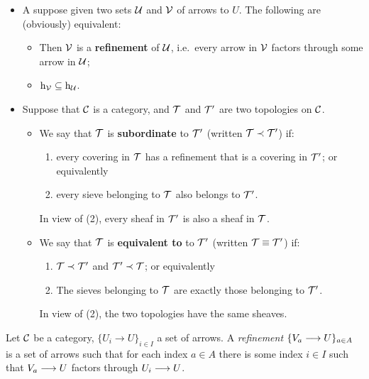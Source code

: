 \begin{2   CONTRAVARIANT FUNCTORS}
\begin{2.3 Sheaves in Grothendieck topologies}
\begin{shaded}
\begin{itemize}\squishlist
\item A suppose given two sets $\mathcal{U}$ and $\mathcal{V}$ of arrows to $U$. The following are (obviously) equivalent:
\begin{itemize}\squishlist
\item  Then $\mathcal{V}$ is a \textbf{refinement} of $\mathcal{U}$, i.e.\ every arrow in $\mathcal{V}$ factors through some arrow in $\mathcal{U}$;
\item $\mathrm{h}_{\mathcal{V}} \subseteq \mathrm{h}_{\mathcal{U}}$.
\end{itemize}
\item Suppose that $\mathcal{C}$ is a category, and $\mathcal{T}$ and $\mathcal{T}'$ are two topologies on $\mathcal{C}$.
\begin{itemize}\squishlist
\item We say that $\mathcal{T}$ is \textbf{subordinate} to $\mathcal{T}'$ (written $\mathcal{T} \prec \mathcal{T}'$) if:
\begin{enumerate}\squishlist
\item every covering in $\mathcal{T}$ has a refinement that is a covering in $\mathcal{T}'$; or equivalently
\item every sieve belonging to $\mathcal{T}$ also belongs to $\mathcal{T}'$.
\end{enumerate}
In view of (2), every sheaf in $\mathcal{T}'$ is also a sheaf in $\mathcal{T}$.
\item We say that $\mathcal{T}$ is \textbf{equivalent to} to $\mathcal{T}'$ (written $\mathcal{T} \equiv \mathcal{T}'$) if:
\begin{enumerate}\squishlist
\item %
$\mathcal{T} \prec \mathcal{T}'$ and $\mathcal{T}' \prec \mathcal{T}$; or equivalently
\item The sieves belonging to $\mathcal{T}$ are exactly those belonging to $\mathcal{T}'$.
\end{enumerate}
In view of (2), the two topologies have the same sheaves.
\end{itemize}

\end{itemize}






\end{shaded}


\begin{definition}
Let $\mathcal{C}$ be a category, $\{U_i \to U\}_{i \in I}$ a set of arrows. A \emph{refinement}%
 $\{V_a \arr U\}_{a \in A}$ is a set of arrows such that for each index $a \in A$ there is some index $i \in I$ such that $V_a \arr U$ factors through $U_i \arr U$.
\end{definition}


\end{2.3 Sheaves in Grothendieck topologies}
\end{2   CONTRAVARIANT FUNCTORS}
